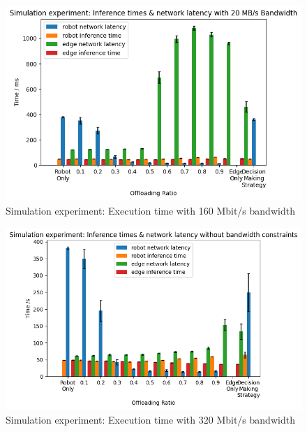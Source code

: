\begin{figure}[htp]
    \centering
    \includegraphics[width=\linewidth]{figures/experiment/simulation/execution_time_160.png}
    \caption{Simulation experiment: Execution time with 160 Mbit/s bandwidth}
    \label{fig:simulation:execution_time_160}
\end{figure}

\begin{figure}[htp]
    \centering
    \includegraphics[width=\linewidth]{figures/experiment/simulation/execution_time_320.png}
    \caption{Simulation experiment: Execution time with 320 Mbit/s bandwidth}
    \label{fig:simulation:execution_time_320}
\end{figure}

